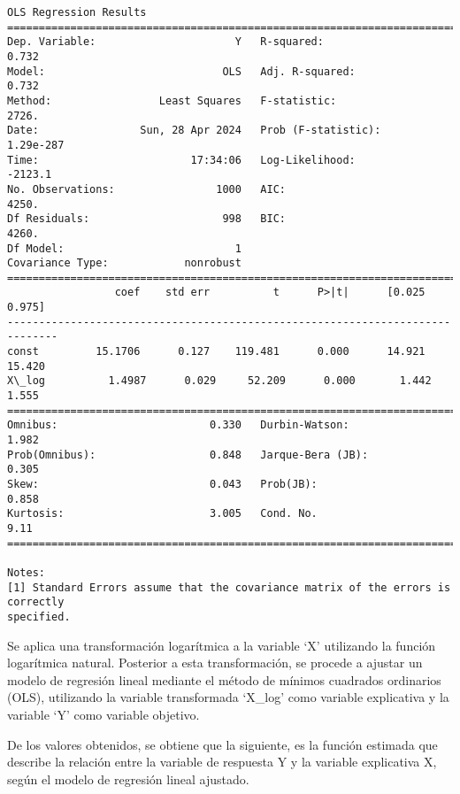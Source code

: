 \documentclass[11pt]{article}
\begin{document}
    \begin{Verbatim}[commandchars=\\\{\}]
                            OLS Regression Results
==============================================================================
Dep. Variable:                      Y   R-squared:                       0.732
Model:                            OLS   Adj. R-squared:                  0.732
Method:                 Least Squares   F-statistic:                     2726.
Date:                Sun, 28 Apr 2024   Prob (F-statistic):          1.29e-287
Time:                        17:34:06   Log-Likelihood:                -2123.1
No. Observations:                1000   AIC:                             4250.
Df Residuals:                     998   BIC:                             4260.
Df Model:                           1
Covariance Type:            nonrobust
==============================================================================
                 coef    std err          t      P>|t|      [0.025      0.975]
------------------------------------------------------------------------------
const         15.1706      0.127    119.481      0.000      14.921      15.420
X\_log          1.4987      0.029     52.209      0.000       1.442       1.555
==============================================================================
Omnibus:                        0.330   Durbin-Watson:                   1.982
Prob(Omnibus):                  0.848   Jarque-Bera (JB):                0.305
Skew:                           0.043   Prob(JB):                        0.858
Kurtosis:                       3.005   Cond. No.                         9.11
==============================================================================

Notes:
[1] Standard Errors assume that the covariance matrix of the errors is correctly
specified.
    \end{Verbatim}

    Se aplica una transformación logarítmica a la variable `X' utilizando la
función logarítmica natural. Posterior a esta transformación, se procede
a ajustar un modelo de regresión lineal mediante el método de mínimos
cuadrados ordinarios (OLS), utilizando la variable transformada `X\_log'
como variable explicativa y la variable `Y' como variable objetivo.

De los valores obtenidos, se obtiene que la siguiente, es la función
estimada que describe la relación entre la variable de respuesta Y y la
variable explicativa X, según el modelo de regresión lineal ajustado.
\end{document}
